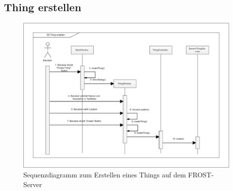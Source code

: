 \clearpage
\subsection{Thing erstellen}
\begin{figure}[htbp]
\centering
\includegraphics[scale=0.44]{uml/SD_createThing.eps}
\caption{Sequenzdiagramm zum Erstellen eines Things auf dem FROST-Server}
\end{figure}